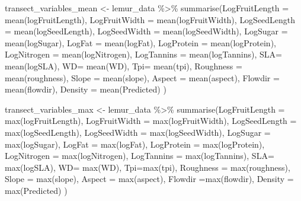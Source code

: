 \documentclass[
  12pt,
]{article}
\newenvironment{Shaded}{\begin{snugshade}}{\end{snugshade}}
\newcommand{\AttributeTok}[1]{\textcolor[rgb]{0.77,0.63,0.00}{#1}}
\newcommand{\FunctionTok}[1]{\textcolor[rgb]{0.00,0.00,0.00}{#1}}
\newcommand{\NormalTok}[1]{#1}
\newcommand{\OtherTok}[1]{\textcolor[rgb]{0.56,0.35,0.01}{#1}}
\newcommand{\SpecialCharTok}[1]{\textcolor[rgb]{0.00,0.00,0.00}{#1}}
\begin{document}
\begin{Shaded}
\begin{Highlighting}[]
\NormalTok{transect\_variables\_mean }\OtherTok{\textless{}{-}}\NormalTok{ lemur\_data }\SpecialCharTok{\%\textgreater{}\%}
  \FunctionTok{summarise}\NormalTok{(}\AttributeTok{LogFruitLength =} \FunctionTok{mean}\NormalTok{(logFruitLength),}
            \AttributeTok{LogFruitWidth =} \FunctionTok{mean}\NormalTok{(logFruitWidth),}
            \AttributeTok{LogSeedLength =} \FunctionTok{mean}\NormalTok{(logSeedLength),}
          \AttributeTok{LogSeedWidth =} \FunctionTok{mean}\NormalTok{(logSeedWidth),}
            \AttributeTok{LogSugar =} \FunctionTok{mean}\NormalTok{(logSugar),}
            \AttributeTok{LogFat =} \FunctionTok{mean}\NormalTok{(logFat),}
            \AttributeTok{LogProtein =} \FunctionTok{mean}\NormalTok{(logProtein),}
            \AttributeTok{LogNitrogen =} \FunctionTok{mean}\NormalTok{(logNitrogen),}
            \AttributeTok{LogTannins =} \FunctionTok{mean}\NormalTok{(logTannins),}
            \AttributeTok{SLA=} \FunctionTok{mean}\NormalTok{(logSLA),}
            \AttributeTok{WD=} \FunctionTok{mean}\NormalTok{(WD),}
            \AttributeTok{Tpi=} \FunctionTok{mean}\NormalTok{(tpi),}
            \AttributeTok{Roughness =} \FunctionTok{mean}\NormalTok{(roughness),}
            \AttributeTok{Slope =} \FunctionTok{mean}\NormalTok{(slope),}
            \AttributeTok{Aspect =} \FunctionTok{mean}\NormalTok{(aspect),}
            \AttributeTok{Flowdir =} \FunctionTok{mean}\NormalTok{(flowdir),}
          \AttributeTok{Density =} \FunctionTok{mean}\NormalTok{(Predicted)}
\NormalTok{            )}

\NormalTok{transect\_variables\_max }\OtherTok{\textless{}{-}}\NormalTok{ lemur\_data }\SpecialCharTok{\%\textgreater{}\%}
  \FunctionTok{summarise}\NormalTok{(}\AttributeTok{LogFruitLength =} \FunctionTok{max}\NormalTok{(logFruitLength),}
            \AttributeTok{LogFruitWidth =} \FunctionTok{max}\NormalTok{(logFruitWidth),}
            \AttributeTok{LogSeedLength =} \FunctionTok{max}\NormalTok{(logSeedLength),}
            \AttributeTok{LogSeedWidth =} \FunctionTok{max}\NormalTok{(logSeedWidth),}
            \AttributeTok{LogSugar =} \FunctionTok{max}\NormalTok{(logSugar),}
            \AttributeTok{LogFat =} \FunctionTok{max}\NormalTok{(logFat),}
            \AttributeTok{LogProtein =} \FunctionTok{max}\NormalTok{(logProtein),}
          \AttributeTok{LogNitrogen =} \FunctionTok{max}\NormalTok{(logNitrogen),}
            \AttributeTok{LogTannins =} \FunctionTok{max}\NormalTok{(logTannins),}
            \AttributeTok{SLA=} \FunctionTok{max}\NormalTok{(logSLA),}
            \AttributeTok{WD=} \FunctionTok{max}\NormalTok{(WD),}
            \AttributeTok{Tpi=}\FunctionTok{max}\NormalTok{(tpi),}
            \AttributeTok{Roughness =} \FunctionTok{max}\NormalTok{(roughness),}
            \AttributeTok{Slope =} \FunctionTok{max}\NormalTok{(slope),}
            \AttributeTok{Aspect =} \FunctionTok{max}\NormalTok{(aspect),}
            \AttributeTok{Flowdir =}\FunctionTok{max}\NormalTok{(flowdir),}
           \AttributeTok{Density =} \FunctionTok{max}\NormalTok{(Predicted)}
\NormalTok{            )}


\end{Highlighting}
\end{Shaded}
\end{document}

